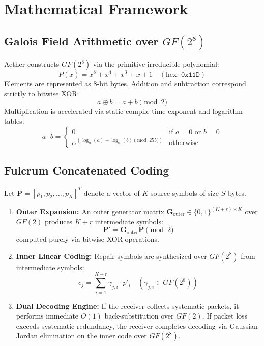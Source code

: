 \documentclass[10pt,twocolumn]{article}
\begin{document}
\section{Mathematical Framework}
\subsection{Galois Field Arithmetic over $GF(2^8)$}
Aether constructs $GF(2^8)$ via the primitive irreducible polynomial:
\begin{equation}
P(x) = x^8 + x^4 + x^3 + x + 1 \quad (\text{hex: } \texttt{0x11D})
\end{equation}
Elements are represented as 8-bit bytes. Addition and subtraction correspond strictly to bitwise XOR:
\begin{equation}
a \oplus b = a + b \pmod 2
\end{equation}
Multiplication is accelerated via static compile-time exponent and logarithm tables:
\begin{equation}
a \cdot b = \begin{cases} 
0 & \text{if } a=0 \text{ or } b=0 \\ 
\alpha^{(\log_\alpha(a) + \log_\alpha(b) \pmod{255})} & \text{otherwise} 
\end{cases}
\end{equation}

\subsection{Fulcrum Concatenated Coding}
Let $\mathbf{P} = [p_1, p_2, \dots, p_K]^T$ denote a vector of $K$ source symbols of size $S$ bytes.
\begin{enumerate}
    \item \textbf{Outer Expansion:} An outer generator matrix $\mathbf{G}_{\text{outer}} \in \{0, 1\}^{(K+r) \times K}$ over $GF(2)$ produces $K+r$ intermediate symbols:
    \begin{equation}
    \mathbf{P}' = \mathbf{G}_{\text{outer}} \mathbf{P} \pmod 2
    \end{equation}
    computed purely via bitwise XOR operations.
    \item \textbf{Inner Linear Coding:} Repair symbols are synthesized over $GF(2^8)$ from intermediate symbols:
    \begin{equation}
    c_j = \sum_{i=1}^{K+r} \gamma_{j,i} \cdot p'_i \quad (\gamma_{j,i} \in GF(2^8))
    \end{equation}
    \item \textbf{Dual Decoding Engine:} If the receiver collects systematic packets, it performs immediate $O(1)$ back-substitution over $GF(2)$. If packet loss exceeds systematic redundancy, the receiver completes decoding via Gaussian-Jordan elimination on the inner code over $GF(2^8)$.
\end{enumerate}
\end{document}
